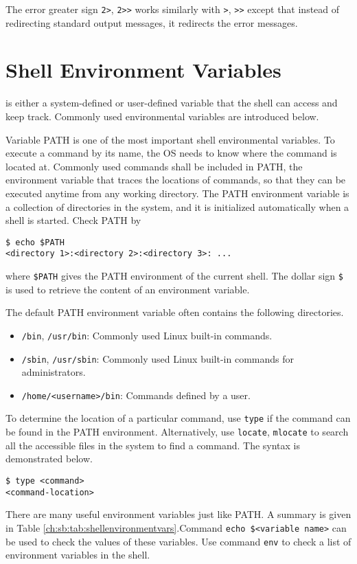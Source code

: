 The error greater sign \verb|2>|, \verb|2>>| works similarly with \verb|>|, \verb|>>| except that instead of redirecting standard output messages, it redirects the error messages.

\section{Shell Environment Variables}\label{ch:sb:subsec:shellenvvar}

 is either a system-defined or user-defined variable that the shell can access and keep track. Commonly used environmental variables are introduced below.

Variable PATH is one of the most important shell environmental variables. To execute a command by its name, the OS needs to know where the command is located at. Commonly used commands shall be included in PATH, the environment variable that traces the locations of commands, so that they can be executed anytime from any working directory. The PATH environment variable is a collection of directories in the system, and it is initialized automatically when a shell is started. Check PATH by
\begin{lstlisting}
$ echo $PATH
<directory 1>:<directory 2>:<directory 3>: ...
\end{lstlisting}
where \verb|$PATH| gives the PATH environment of the current shell. The dollar sign \verb|$| is used to retrieve the content of an environment variable. 

The default PATH environment variable often contains the following directories. 
\begin{itemize}
\item \verb|/bin|, \verb|/usr/bin|: Commonly used Linux built-in commands.
\item \verb|/sbin|, \verb|/usr/sbin|: Commonly used Linux built-in commands for administrators.
\item \verb|/home/<username>/bin|: Commands defined by a user.
\end{itemize}
To determine the location of a particular command, use \verb|type| if the command can be found in the PATH environment. Alternatively, use \verb|locate|, \verb|mlocate| to search all the accessible files in the system to find a command. The syntax is demonstrated below.
\begin{lstlisting}
$ type <command>
<command-location>
\end{lstlisting}

There are many useful environment variables just like PATH. A summary is given in Table \ref{ch:sb:tab:shellenvironmentvars}.Command \verb|echo $<variable name>| can be used to check the values of these variables. Use command \verb|env| to check a list of environment variables in the shell.

